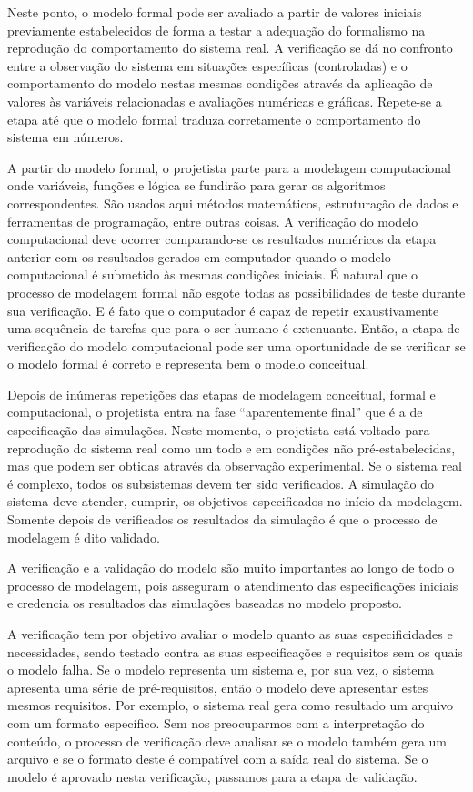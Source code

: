 \documentclass[a4paper,12pt,oneside,onecolumn]{uerj}
\begin{document}
Neste ponto, o modelo formal pode ser avaliado a partir de valores iniciais previamente estabelecidos de forma a testar a adequação do formalismo na reprodução do comportamento do sistema real. A verificação se dá no confronto entre a observação do sistema em situações específicas (controladas) e o comportamento do modelo nestas mesmas condições através da aplicação de valores às variáveis relacionadas e avaliações numéricas e gráficas. Repete-se a etapa até que o modelo formal traduza corretamente o comportamento do sistema em números.

A partir do modelo formal, o projetista parte para a modelagem computacional onde variáveis, funções e lógica se fundirão para gerar os algoritmos correspondentes. São usados aqui métodos matemáticos, estruturação de dados e ferramentas de programação, entre outras coisas. A verificação do modelo computacional deve ocorrer comparando-se os resultados numéricos da etapa anterior com os resultados gerados em computador quando o modelo computacional é submetido às mesmas condições iniciais. É natural que o processo de modelagem formal não esgote todas as possibilidades de teste durante sua verificação. E é fato que o computador é capaz de repetir exaustivamente uma sequência de tarefas que para o ser humano é extenuante. Então, a etapa de verificação do modelo computacional pode ser uma oportunidade de se verificar se o modelo formal é correto e representa bem o modelo conceitual.

Depois de inúmeras repetições das etapas de modelagem conceitual, formal e computacional, o projetista entra na fase ``aparentemente final'' que é a de especificação das simulações. Neste momento, o projetista está voltado para reprodução do sistema real como um todo e em condições não pré-estabelecidas, mas que podem ser obtidas através da observação experimental. Se o sistema real é complexo, todos os subsistemas devem ter sido verificados. A simulação do sistema deve atender, cumprir, os objetivos especificados no início da modelagem. Somente depois de verificados os resultados da simulação é que o processo de modelagem é dito validado.

A verificação e a validação do modelo são muito importantes ao longo de todo o processo de modelagem, pois asseguram o atendimento das especificações iniciais e credencia os resultados das simulações baseadas no modelo proposto. 

A verificação tem por objetivo avaliar o modelo quanto as suas especificidades e necessidades, sendo testado contra as suas especificações e requisitos sem os quais o modelo falha. Se o modelo representa um sistema e, por sua vez, o sistema apresenta uma série de pré-requisitos, então o modelo deve apresentar estes mesmos requisitos. Por exemplo, o sistema real gera como resultado um arquivo com um formato específico. Sem nos preocuparmos com a interpretação do conteúdo, o processo de verificação deve analisar se o modelo também gera um arquivo e se o formato deste é compatível com a saída real do sistema. Se o modelo é aprovado nesta verificação, passamos para a etapa de validação.
\end{document}

